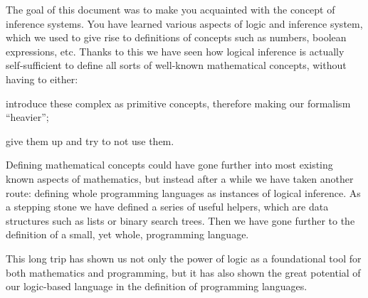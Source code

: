 The goal of this document was to make you acquainted with the concept of inference systems. You have learned various aspects of logic and inference system, which we used to give rise to definitions of concepts such as numbers, boolean expressions, etc. Thanks to this we have seen how logical inference is actually self-sufficient to define all sorts of well-known mathematical concepts, without having to either:

\begin{inparaenum}
\item introduce these complex as primitive concepts, therefore making our formalism ``heavier'';
\item give them up and try to not use them.
\end{inparaenum}

Defining mathematical concepts could have gone further into most existing known aspects of mathematics, but instead after a while we have taken another route: defining whole programming languages as instances of logical inference. As a stepping stone we have defined a series of useful helpers, which are data structures such as lists or binary search trees. Then we have gone further to the definition of a small, yet whole, programming language.

This long trip has shown us not only the power of logic as a foundational tool for both mathematics and programming, but it has also shown the great potential of our logic-based language in the definition of programming languages.
